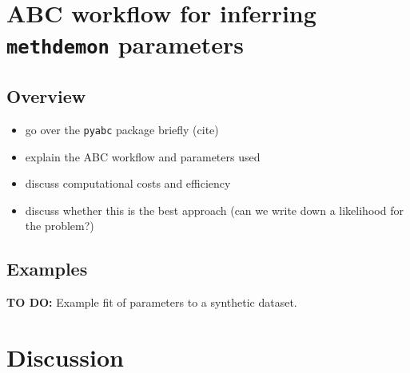 \section{ABC workflow for inferring \texttt{methdemon} parameters}\label{section:methabc}

\subsection{Overview}
\begin{itemize}
    \item go over the \texttt{pyabc} package briefly (cite)
    \item explain the ABC workflow and parameters used
    \item discuss computational costs and efficiency
    \item discuss whether this is the best approach (can we write down a likelihood for the problem?)
\end{itemize}

\subsection{Examples}
\textbf{TO DO:} Example fit of parameters to a synthetic dataset.


\section{Discussion}
